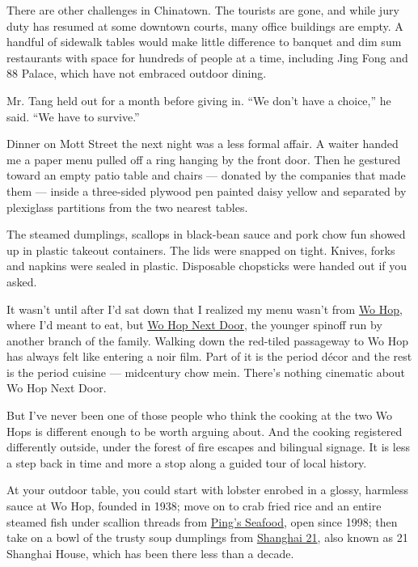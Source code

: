 There are other challenges in Chinatown. The tourists are gone, and
while jury duty has resumed at some downtown courts, many office
buildings are empty. A handful of sidewalk tables would make little
difference to banquet and dim sum restaurants with space for hundreds of
people at a time, including Jing Fong and 88 Palace, which have not
embraced outdoor dining.

Mr. Tang held out for a month before giving in. ``We don't have a
choice,'' he said. ``We have to survive.''

Dinner on Mott Street the next night was a less formal affair. A waiter
handed me a paper menu pulled off a ring hanging by the front door. Then
he gestured toward an empty patio table and chairs --- donated by the
companies that made them --- inside a three-sided plywood pen painted
daisy yellow and separated by plexiglass partitions from the two nearest
tables.

The steamed dumplings, scallops in black-bean sauce and pork chow fun
showed up in plastic takeout containers. The lids were snapped on tight.
Knives, forks and napkins were sealed in plastic. Disposable chopsticks
were handed out if you asked.

It wasn't until after I'd sat down that I realized my menu wasn't from
\href{https://www.wohop17.com/}{Wo Hop}, where I'd meant to eat, but
\href{https://www.wohop15.com/menu}{Wo Hop Next Door}, the younger
spinoff run by another branch of the family. Walking down the red-tiled
passageway to Wo Hop has always felt like entering a noir film. Part of
it is the period décor and the rest is the period cuisine --- midcentury
chow mein. There's nothing cinematic about Wo Hop Next Door.

But I've never been one of those people who think the cooking at the two
Wo Hops is different enough to be worth arguing about. And the cooking
registered differently outside, under the forest of fire escapes and
bilingual signage. It is less a step back in time and more a stop along
a guided tour of local history.

At your outdoor table, you could start with lobster enrobed in a glossy,
harmless sauce at Wo Hop, founded in 1938; move on to crab fried rice
and an entire steamed fish under scallion threads from
\href{https://www.nytimes.com/2000/08/09/dining/restaurants-diners-and-dinner-exchanging-glances.html?searchResultPosition=1}{Ping's
Seafood}, open since 1998; then take on a bowl of the trusty soup
dumplings from \href{https://shanghai21togo.com/\#}{Shanghai 21}, also
known as 21 Shanghai House, which has been there less than a decade.

